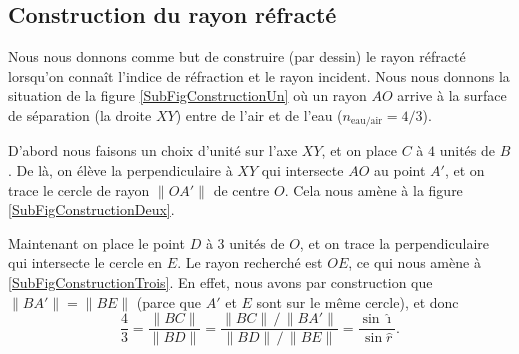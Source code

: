 \subsection{Construction du rayon réfracté}

Nous nous donnons comme but de construire (par dessin) le rayon réfracté lorsqu'on connaît l'indice de réfraction et le rayon incident. Nous nous donnons la situation de la figure \ref{SubFigConstructionUn} où un rayon $AO$ arrive à la surface de séparation (la droite $XY$) entre de l'air et de l'eau ($n_{\text{eau/air}}=4/3$).

D'abord nous faisons un choix d'unité sur l'axe $XY$, et on place $C$ à $4$ unités de $B$. De là, on élève la perpendiculaire à $XY$ qui intersecte $AO$ au point $A'$, et on trace le cercle de rayon $\| OA' \|$ de centre $O$. Cela nous amène à la figure \ref{SubFigConstructionDeux}.

Maintenant on place le point $D$ à $3$ unités de $O$, et on trace la perpendiculaire qui intersecte le cercle en $E$. Le rayon recherché est $OE$, ce qui nous amène à \ref{SubFigConstructionTrois}. En effet, nous avons par construction que $\| BA' \|=\| BE \|$ (parce que $A'$ et $E$ sont sur le même cercle), et donc
\[ 
  \frac{ 4 }{ 3 }=\frac{ \| BC \| }{ \| BD \| }=\frac{ \| BC \|\,/\,\| BA' \| }{ \| BD \|\,/\,\| BE \| }=\frac{ \sin\hat\imath }{ \sin\hat r }.
\]

